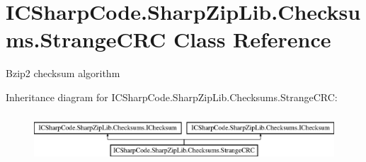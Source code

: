 \hypertarget{class_i_c_sharp_code_1_1_sharp_zip_lib_1_1_checksums_1_1_strange_c_r_c}{}\section{I\+C\+Sharp\+Code.\+Sharp\+Zip\+Lib.\+Checksums.\+Strange\+C\+RC Class Reference}
\label{class_i_c_sharp_code_1_1_sharp_zip_lib_1_1_checksums_1_1_strange_c_r_c}


Bzip2 checksum algorithm  


Inheritance diagram for I\+C\+Sharp\+Code.\+Sharp\+Zip\+Lib.\+Checksums.\+Strange\+C\+RC\+:\begin{figure}[H]
\begin{center}
\leavevmode
\includegraphics[height=1.794872cm]{class_i_c_sharp_code_1_1_sharp_zip_lib_1_1_checksums_1_1_strange_c_r_c}
\end{center}
\end{figure}
